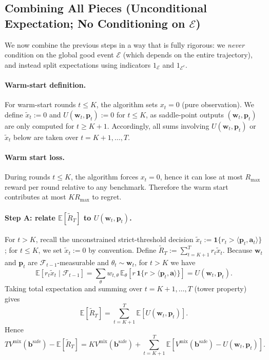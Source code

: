 \documentclass[11pt]{article}
\newcommand{\bbS}{\mathbf{b}^{\mathrm{safe}}}
\newcommand{\ba}{\mathbf{a}}
\newcommand{\bp}{\mathbf{p}}
\newcommand{\bw}{\mathbf{w}}
\newcommand{\E}{\mathbb{E}}
\begin{document}
\subsection{Combining All Pieces (Unconditional Expectation; No Conditioning on $\mathcal E$)}

We now combine the previous steps in a way that is fully rigorous: we \emph{never} condition on the global
good event $\mathcal E$ (which depends on the entire trajectory), and instead split expectations using
indicators $1_{\mathcal E}$ and $1_{\mathcal E^c}$.

\paragraph{Warm-start definition.}
For warm-start rounds $t\le K$, the algorithm sets $x_t=0$ (pure observation).
We define $\tilde x_t:=0$ and $U(\bw_t,\bp_t):=0$ for $t\le K$, as saddle-point
outputs $(\bw_t,\bp_t)$ are only computed for $t\ge K+1$. Accordingly, all sums
involving $U(\bw_t,\bp_t)$ or $\tilde x_t$ below are taken over $t=K+1,\dots,T$.

\paragraph{Warm start loss.}
During rounds $t\le K$, the algorithm forces $x_t=0$, hence it can lose at most $R_{\max}$ reward per round
relative to any benchmark. Therefore the warm start contributes at most $K R_{\max}$ to regret.

\paragraph{Step A: relate $\E[\tilde R_T]$ to $U(\bw_t,\bp_t)$.}
For $t > K$, recall the unconstrained strict-threshold decision $\tilde x_t:=\mathbf{1}\{r_t>\langle \bp_t,\ba_t\rangle\}$;
for $t \le K$, we set $\tilde x_t := 0$ by convention. Define $\tilde R_T:=\sum_{t=K+1}^T r_t\tilde x_t$.
Because $\bw_t$ and $\bp_t$ are $\mathcal F_{t-1}$-measurable and $\theta_t\sim \bw_t$, for $t > K$ we have
\[
\E[r_t\tilde x_t\mid \mathcal F_{t-1}]
=
\sum_{\theta} w_{t,\theta}\,\E_{\theta}\!\left[r\,\mathbf{1}\{r>\langle \bp_t,\ba\rangle\}\right]
=
U(\bw_t,\bp_t).
\]
Taking total expectation and summing over $t=K+1,\ldots,T$ (tower property) gives
\[
\E[\tilde R_T]=\sum_{t=K+1}^T \E\!\left[U(\bw_t,\bp_t)\right].
\]
Hence
\[
T V^{\mathrm{mix}}(\bbS)-\E[\tilde R_T]
=
K V^{\mathrm{mix}}(\bbS) + \sum_{t=K+1}^T \E\!\left[V^{\mathrm{mix}}(\bbS)-U(\bw_t,\bp_t)\right].
\]
\end{document}
